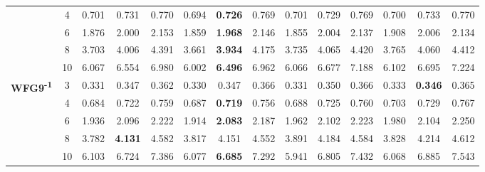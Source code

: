 \documentclass[onecolumn,10pt]{asme2ej}
\begin{document}
\begin{table}[!htb]
\begin{tabular}{|c|c|c|c|c|c|c|c|c|c|c|c|c|c|}
		& 4          & 0.701         & 0.731          & 0.770          & 0.694         & \textbf{0.726}  & 0.769          & 0.701         & 0.729          & 0.769          & 0.700         & 0.733          & 0.770          \\ \cline{2-14} 
		& 6          & 1.876         & 2.000          & 2.153          & 1.859         & \textbf{1.968}  & 2.146          & 1.855         & 2.004          & 2.137          & 1.908         & 2.006          & 2.134          \\ \cline{2-14} 
		& 8          & 3.703         & 4.006          & 4.391          & 3.661         & \textbf{3.934}  & 4.175          & 3.735         & 4.065          & 4.420          & 3.765         & 4.060          & 4.412          \\ \cline{2-14} 
		& 10         & 6.067         & 6.554          & 6.980          & 6.002         & \textbf{6.496}  & 6.962          & 6.066         & 6.677          & 7.188          & 6.102         & 6.695          & 7.224          \\ \hline
		\multirow{5}{*}{\textbf{WFG9\textsuperscript{-1}}} & 3          & 0.331         & 0.347          & 0.362          & 0.330         & 0.347           & 0.366          & 0.331         & 0.350          & 0.366          & 0.333         & \textbf{0.346} & 0.365          \\ \cline{2-14} 
		& 4          & 0.684         & 0.722          & 0.759          & 0.687         & \textbf{0.719}  & 0.756          & 0.688         & 0.725          & 0.760          & 0.703         & 0.729          & 0.767          \\ \cline{2-14} 
		& 6          & 1.936         & 2.096          & 2.222          & 1.914         & \textbf{2.083}  & 2.187          & 1.962         & 2.102          & 2.223          & 1.980         & 2.104          & 2.250          \\ \cline{2-14} 
		& 8          & 3.782         & \textbf{4.131} & 4.582          & 3.817         & 4.151           & 4.552          & 3.891         & 4.184          & 4.584          & 3.828         & 4.214          & 4.612          \\ \cline{2-14} 
		& 10         & 6.103         & 6.724          & 7.386          & 6.077         & \textbf{6.685}  & 7.292          & 5.941         & 6.805          & 7.432          & 6.068         & 6.885          & 7.543          \\ \hline
	\end{tabular}
\end{table}
\end{document}
